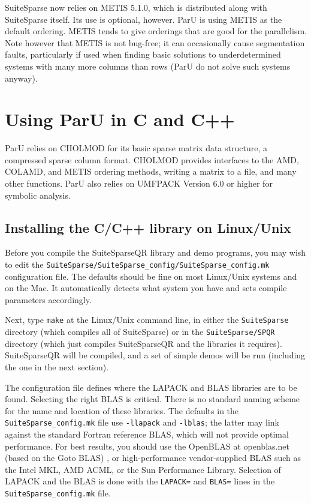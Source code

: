 \documentclass[12pt]{article}
\begin{document}
SuiteSparse now relies on METIS 5.1.0, which is distributed along with
SuiteSparse itself.  Its use is optional, however. ParU is using METIS as the 
default ordering. METIS tends to give orderings that are good for the 
parallelism.
Note however that METIS is not bug-free; it can occasionally cause segmentation 
faults, particularly if used when finding basic solutions to underdetermined 
systems with many more columns than rows (ParU do not solve such 
systems anyway).

\section{Using ParU in C and C++}

ParU relies on CHOLMOD for its basic sparse matrix data structure, a compressed 
sparse column format.  CHOLMOD provides interfaces to the AMD, COLAMD, and METIS
ordering methods, writing a matrix to a file, and many other
functions. ParU also relies on UMFPACK Version 6.0 or higher for symbolic 
analysis. 


\subsection{Installing the C/C++ library on Linux/Unix}

Before you compile the SuiteSparseQR library and demo programs, you may wish to
edit the \verb'SuiteSparse/SuiteSparse_config/SuiteSparse_config.mk' configuration file.  The
defaults should be fine on most Linux/Unix systems and on the Mac.
It automatically detects what system you have and sets compile parameters
accordingly.

Next, type \verb'make' at
the Linux/Unix command line, in either the \verb'SuiteSparse' directory (which
compiles all of SuiteSparse) or in the \verb'SuiteSparse/SPQR' directory (which
just compiles SuiteSparseQR and the libraries it requires).  SuiteSparseQR will
be compiled, and a set of simple demos will be run (including the one in the
next section).

The configuration file defines where the LAPACK and BLAS libraries are to be
found.  Selecting the right BLAS is critical.  There is no standard naming
scheme for the name and location of these libraries.  The defaults in the
\verb'SuiteSparse_config.mk' file use \verb'-llapack' and \verb'-lblas'; the latter may
link against the standard Fortran reference BLAS, which will not provide
optimal performance.  For best results, you should use the OpenBLAS
at openblas.net
(based on the Goto BLAS)
\cite{GotoVanDeGeijn08}, or high-performance vendor-supplied BLAS such as the
Intel MKL, AMD ACML, or the Sun Performance Library.  Selection of LAPACK and
the BLAS is done with the \verb'LAPACK=' and \verb'BLAS=' lines in the
\verb'SuiteSparse_config.mk' file.
\end{document}
